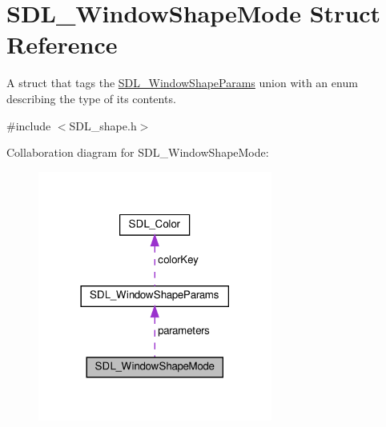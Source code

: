 \hypertarget{structSDL__WindowShapeMode}{}\section{S\+D\+L\+\_\+\+Window\+Shape\+Mode Struct Reference}
\label{structSDL__WindowShapeMode}


A struct that tags the \hyperlink{unionSDL__WindowShapeParams}{S\+D\+L\+\_\+\+Window\+Shape\+Params} union with an enum describing the type of its contents.  




{\ttfamily \#include $<$S\+D\+L\+\_\+shape.\+h$>$}



Collaboration diagram for S\+D\+L\+\_\+\+Window\+Shape\+Mode\+:\nopagebreak
\begin{figure}[H]
\begin{center}
\leavevmode
\includegraphics[width=218pt]{structSDL__WindowShapeMode__coll__graph}
\end{center}
\end{figure}
